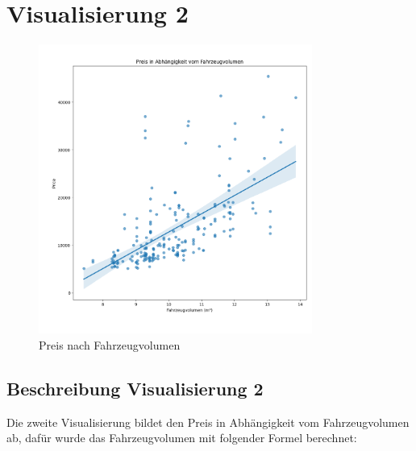 \documentclass[a4paper,12pt]{article}
\begin{document}
\section{Visualisierung 2}
\begin{figure}[H]
    \centering
    \includegraphics[width=0.8\textwidth]{../images/preis_nach_fahrzeugvolumen.png} %
    \caption{Preis nach Fahrzeugvolumen}
    \label{fig:vis2}
\end{figure}

\subsection*{Beschreibung Visualisierung 2}
Die zweite Visualisierung bildet den Preis in Abhängigkeit vom Fahrzeugvolumen ab, dafür wurde das
Fahrzeugvolumen mit folgender Formel berechnet: 


\end{document}
